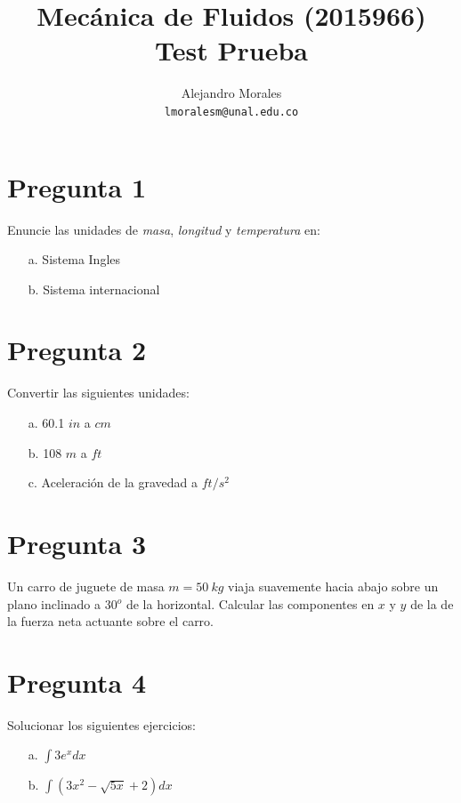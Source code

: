 \documentclass[11pt, oneside]{article}   	%
\title{\vspace{-3cm} Mec\'anica de Fluidos (2015966)\\Test Prueba \vspace{-0.7cm}}
\author{Alejandro Morales \\ \texttt{lmoralesm@unal.edu.co}}
\date{}							%
\begin{document}
\maketitle

\vspace{-1.1cm}
\section*{Pregunta 1}\vspace{-0.3cm}
Enuncie las unidades de \emph{masa}, \emph{longitud} y \emph{temperatura} en:
\begin{itemize}
\item[a.] Sistema Ingles
\item[b.] Sistema internacional
\end{itemize}
	

\section*{Pregunta 2}\vspace{-0.3cm}
Convertir las siguientes unidades:
\begin{itemize}
\item[a.] 60.1 $in$ a $cm$ 
\item[b.] 108 $m$ a $ft$
\item[c.] Aceleraci\'on de la gravedad a $ft/s^2$
\end{itemize}
	
\section*{Pregunta 3}\vspace{-0.3cm}
Un carro de juguete de masa $m=50\ kg$ viaja suavemente hacia abajo sobre un plano inclinado a 30$^o$ de la horizontal. Calcular las componentes en $x$ y $y$ de la de la fuerza neta actuante sobre el carro.
	
\section*{Pregunta 4}\vspace{-0.3cm}
Solucionar los siguientes ejercicios:
\begin{itemize}
\item[a.] $\int 3e^x dx$ 
\item[b.] $\int (3x^2 - \sqrt{5x} +2) dx$
\end{itemize}
	
\end{document}
